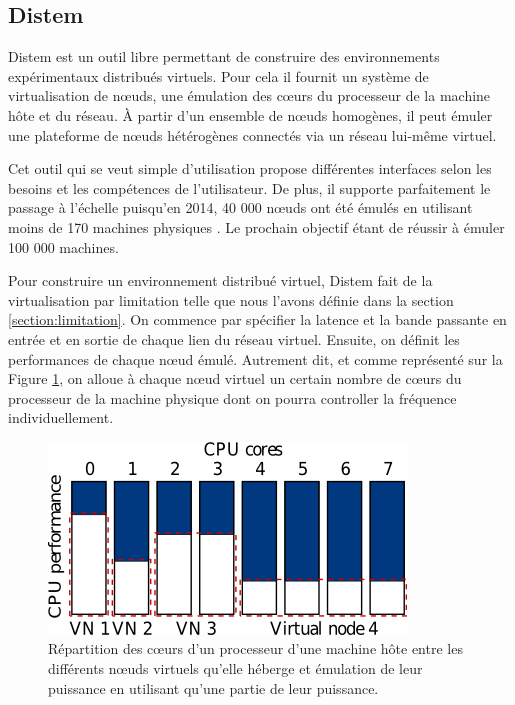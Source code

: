\subsection{Distem}
\label{subsection:Distem}

Distem \citep{DISTEM} est un outil libre permettant de construire des
environnements expérimentaux distribués virtuels. Pour cela il fournit un
système de virtualisation de n\oe uds, une émulation des c\oe urs du processeur
de la machine hôte et du réseau. À partir d'un ensemble de n\oe uds homogènes,
il peut émuler une plateforme de n\oe uds hétérogènes connectés via un réseau
lui-même virtuel.

Cet outil qui se veut simple d'utilisation propose différentes interfaces selon
les besoins et les compétences de l'utilisateur. De plus, il supporte
parfaitement le passage à l'échelle puisqu'en 2014, 40 000 n\oe uds ont été
émulés en utilisant moins de 170 machines physiques
\citep{DISTEM_buchert2014emulation}. Le prochain objectif étant de réussir à
émuler 100 000 machines.

Pour construire un environnement distribué virtuel, Distem fait de la
virtualisation par limitation telle que nous l'avons définie dans la section
\ref{section:limitation}. On commence par spécifier la latence et la bande
passante en entrée et en sortie de chaque lien du réseau virtuel. Ensuite, on
définit les performances de chaque n\oe ud émulé. Autrement dit, et comme
représenté sur la Figure \ref{Distem_core}, on alloue à chaque n\oe ud virtuel
un certain nombre de c\oe urs du processeur de la machine physique dont on
pourra controller la fréquence individuellement.

\begin{figure}[H]
  \centering
  \includegraphics[scale=0.70]{Pictures/png/Distem_repartion_coeurs_v1}
  \caption{Répartition des c\oe urs d'un processeur d'une machine hôte entre les différents n\oe uds virtuels qu'elle héberge et émulation de leur puissance en utilisant qu'une partie de leur puissance.}
  \label{Distem_core}
\end{figure}
  
